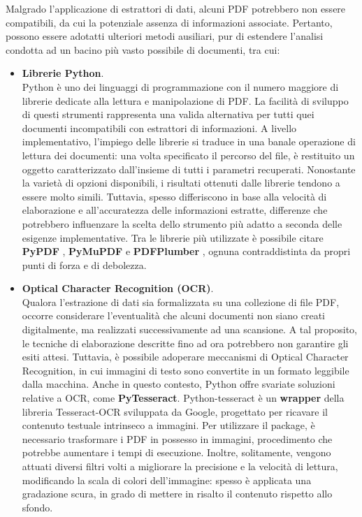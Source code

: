 Malgrado l'applicazione di estrattori di dati, alcuni PDF potrebbero non essere compatibili, da cui la potenziale assenza di informazioni associate. Pertanto, possono essere adotatti ulteriori metodi ausiliari, pur di estendere l'analisi condotta ad un bacino più vasto possibile di documenti, tra cui:
\begin{itemize}
    \renewcommand{\labelitemi}{-}
    \item \textbf{Librerie Python}. \\
    Python è uno dei linguaggi di programmazione con il numero maggiore di librerie dedicate alla lettura e manipolazione di PDF. La facilità di sviluppo di questi strumenti rappresenta una valida alternativa per tutti quei documenti incompatibili con estrattori di informazioni. A livello implementativo, l'impiego delle librerie si traduce in una banale operazione di lettura dei documenti: una volta specificato il percorso del file, è restituito un oggetto caratterizzato dall'insieme di tutti i parametri recuperati. Nonostante la varietà di opzioni disponibili, i risultati ottenuti dalle librerie tendono a essere molto simili. Tuttavia, spesso differiscono in base alla velocità di elaborazione e all'accuratezza delle informazioni estratte, differenze che potrebbero influenzare la scelta dello strumento più adatto a seconda delle esigenze implementative. Tra le librerie più utilizzate è possibile citare \textbf{PyPDF} \cite{pypdf2024}, \textbf{PyMuPDF} \cite{pymupdf} e \textbf{PDFPlumber} \cite{pdfplumber}, ognuna contraddistinta da propri punti di forza e di debolezza.
    \item \textbf{Optical Character Recognition (OCR)}. \\
    Qualora l'estrazione di dati sia formalizzata su una collezione di file PDF, occorre considerare l'eventualità che alcuni documenti non siano creati digitalmente, ma realizzati successivamente ad una scansione. A tal proposito, le tecniche di elaborazione descritte fino ad ora potrebbero non garantire gli esiti attesi. Tuttavia, è possibile adoperare meccanismi di Optical Character Recognition, in cui immagini di testo sono convertite in un formato leggibile dalla macchina. Anche in questo contesto, Python offre svariate soluzioni relative a OCR, come \textbf{PyTesseract}. Python-tesseract è un \textbf{wrapper} della libreria Tesseract-OCR sviluppata da Google, progettato per ricavare il contenuto testuale intrinseco a immagini. Per utilizzare il package, è necessario trasformare i PDF in possesso in immagini, procedimento che potrebbe aumentare i tempi di esecuzione. Inoltre, solitamente, vengono attuati diversi filtri volti a migliorare la precisione e la velocità di lettura, modificando la scala di colori dell'immagine: spesso è applicata una gradazione scura, in grado di mettere in risalto il contenuto rispetto allo sfondo.  
\end{itemize}